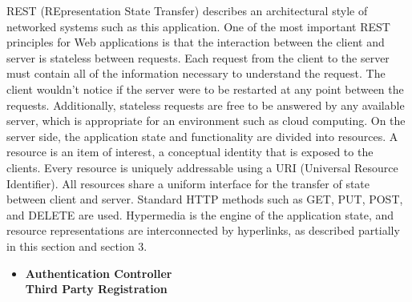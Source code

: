 \begin{legal}
\begin{legal}
				REST (REpresentation State Transfer) describes an architectural style of networked systems such as this application. One of the most important REST principles for Web applications is that the interaction between the client and server is stateless between requests. Each request from the client to the server must contain all of the information necessary to understand the request. The client wouldn't notice if the server were to be restarted at any point between the requests. Additionally, stateless requests are free to be answered by any available server, which is appropriate for an environment such as cloud computing. On the server side, the application state and functionality are divided into resources. A resource is an item of interest, a conceptual identity that is exposed to the clients. Every resource is uniquely addressable using a URI (Universal Resource Identifier). All resources share a uniform interface for the transfer of state between client and server. Standard HTTP methods such as GET, PUT, POST, and DELETE are used. Hypermedia is the engine of the application state, and resource representations are interconnected by hyperlinks, as described partially in this section and section 3.\\

					\begin{itemize}
						\item \textbf{Authentication Controller} \\
						
						\textbf{Third Party Registration} \\
						

\end{itemize}
\end{legal}
\end{legal}
